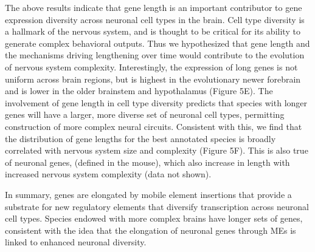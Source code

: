 The above results indicate that gene length is an important contributor to gene expression diversity across neuronal cell types in the brain. Cell type diversity is a hallmark of the nervous system, and is thought to be critical for its ability to generate complex behavioral outputs. Thus we hypothesized that gene length and the mechanisms driving lengthening over time would contribute to the evolution of nervous system complexity. Interestingly, the expression of long genes is not uniform across brain regions, but is highest in the evolutionary newer forebrain and is lower in the older brainstem and hypothalamus (Figure 5E). 
The involvement of gene length in cell type diversity predicts that species with longer genes will have a larger, more diverse set of neuronal cell types, permitting construction of more complex neural circuits. Consistent with this, we find that the distribution of gene lengths for the best annotated species is broadly correlated with nervous system size and complexity (Figure 5F). This is also true of neuronal genes, (defined in the mouse), which also increase in length with increased nervous system complexity (data not shown). 

In summary, genes are elongated by mobile element insertions that provide a substrate for new 
regulatory elements that diversify transcription across neuronal cell types. Species endowed with more complex brains have longer sets of genes, consistent with the idea that the elongation of neuronal genes through MEs is linked to enhanced neuronal diversity.




